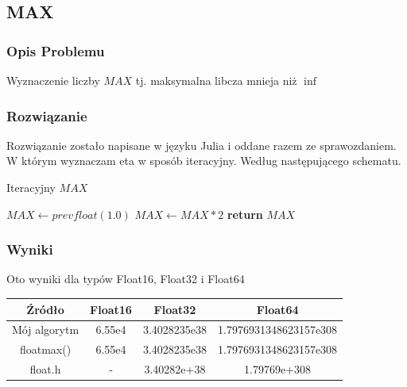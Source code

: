 \documentclass{article}
\begin{document}
\subsection{MAX}
\subsubsection{Opis Problemu}
    Wyznaczenie liczby $MAX$ tj. maksymalna libcza mnieja niż $\inf$
\subsubsection{Rozwiązanie}
    Rozwiązanie zostało napisane w języku Julia i oddane razem ze sprawozdaniem. W którym wyznaczam eta w sposób iteracyjny. Według następującego schematu.
    \begin{algorithm}
    \caption{Iteracyjny $MAX$}\label{alg:cap}
    \begin{algorithmic}
        \State $MAX \gets prevfloat(1.0)$
            \State $MAX \gets MAX * 2$
        \EndWhile
        \State \textbf{return} $MAX$
    \end{algorithmic}
    \end{algorithm}
\subsubsection{Wyniki}
    Oto wyniki dla typów Float16, Float32 i Float64
    \begin{center}
        \begin{tabular}{|c||c|c|c|}
        \hline
            Źródło & Float16 & Float32 & Float64 \\
            \hline\hline
            Mój algorytm & 6.55e4 & 3.4028235e38 & 1.7976931348623157e308\\
             \hline
             floatmax() & 6.55e4 & 3.4028235e38 & 1.7976931348623157e308\\
             \hline
             float.h & - & 3.40282e+38 & 1.79769e+308 \\
        \hline
        \end{tabular}
    \end{center}
\end{document}
